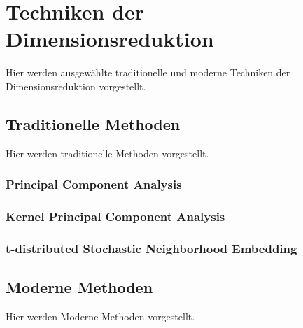 \chapter{Techniken der Dimensionsreduktion}
\label{ch:TechnikenDerDimRed}


Hier werden ausgewählte traditionelle und moderne Techniken der Dimensionsreduktion vorgestellt.

\section{Traditionelle Methoden}
\label{ch:TechnikenDerDimRed:sec:TraditionelleMethoden}

Hier werden traditionelle Methoden vorgestellt.


\newpage

\subsection{Principal Component Analysis}
\label{ch:TechnikenDerDimRed:sec:TradtionelleMethoden:subsec:PCA}

\subsection{Kernel Principal Component Analysis}
\label{ch:TechnikenDerDimRed:sec:TradtionelleMethoden:subsec:kPCA}

\subsection{t-distributed Stochastic Neighborhood Embedding}
\label{ch:TechnikenDerDimRed:sec:TradtionelleMethoden:subsec:t-SNE}

\newpage

\section{Moderne Methoden}
\label{ch:TechnikenDerDimRed:sec:ModerneMethoden}
Hier werden Moderne Methoden vorgestellt.

